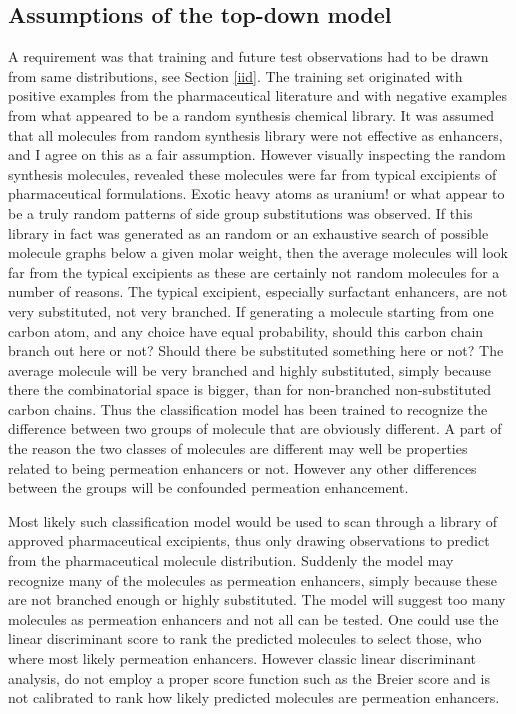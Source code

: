 \subsection{Assumptions of the top-down model}
A requirement was that training and future test observations had to be drawn from same distributions, see Section \ref{iid}. The training set originated with positive examples from the pharmaceutical literature and with negative examples from what appeared to be a random synthesis chemical library. It was assumed that all molecules from random synthesis library were not effective as enhancers, and  I agree on this as a fair assumption. However visually inspecting the random synthesis molecules, revealed these molecules were far from typical excipients of pharmaceutical formulations. Exotic heavy atoms as uranium! or what appear to be a truly random patterns of side group substitutions was observed. If this library in fact was generated as an random or an exhaustive search of possible molecule graphs below a given molar weight, then the average molecules will look far from the typical excipients as these are certainly not random molecules for a number of reasons. The typical excipient, especially surfactant enhancers, are not very substituted, not very branched. If generating a molecule starting from one carbon atom, and any choice have equal probability, should this carbon chain branch out here or not? Should there be substituted something here or not? The average molecule will be very branched and highly substituted, simply because there the combinatorial space is bigger, than for non-branched non-substituted carbon chains. Thus the classification model has been trained to recognize the difference between two groups of molecule that are obviously different. A part of the reason the two classes of molecules are different may well be properties related to being permeation enhancers or not. However any other differences between the groups will be confounded permeation enhancement.

Most likely such classification model would be used to scan through a library of approved pharmaceutical excipients, thus only drawing observations to predict from the pharmaceutical molecule distribution. Suddenly the model may recognize many of the molecules as permeation enhancers, simply because these are not branched enough or highly substituted. The model will suggest too many molecules as permeation enhancers and not all can be tested. One could use the linear discriminant score to rank the predicted molecules to select those, who where most likely permeation enhancers. However classic linear discriminant analysis, do not employ a proper score function such as the Breier score and is not calibrated to rank how likely predicted molecules are permeation enhancers.

